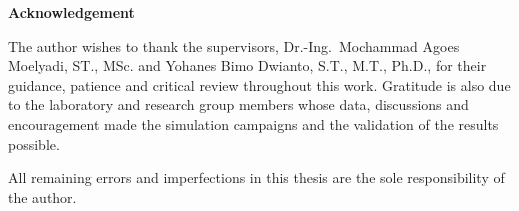 %
%
%
%
%
%
\clearpage
{}
{}
\begin{center}
\textbf{\large Acknowledgement}\\[0.5cm]
\end{center}

\noindent The author wishes to thank the supervisors, Dr.-Ing.~Mochammad Agoes Moelyadi, ST., MSc. and Yohanes Bimo Dwianto, S.T., M.T., Ph.D., for their guidance, patience and critical review throughout this work. Gratitude is also due to the laboratory and research group members whose data, discussions and encouragement made the simulation campaigns and the validation of the results possible.

\vspace{0.5cm}
\noindent All remaining errors and imperfections in this thesis are the sole responsibility of the author.

